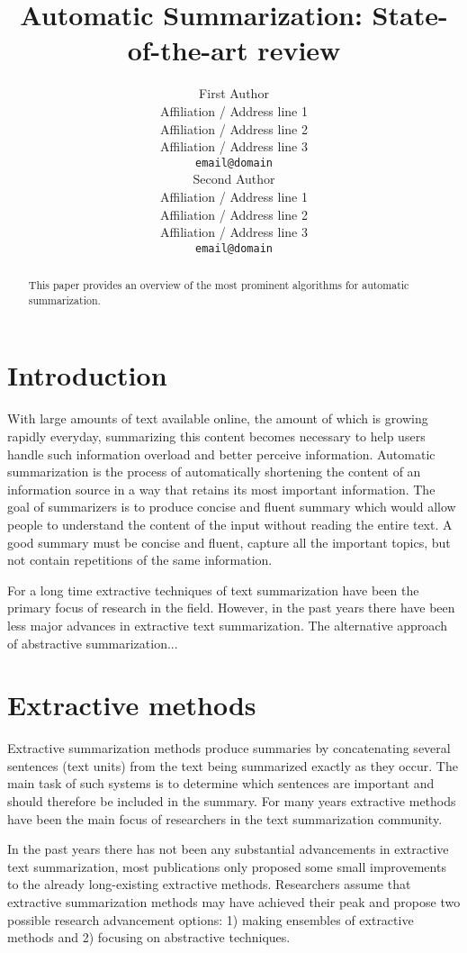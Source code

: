 \documentclass[11pt,a4paper,onecolumn]{article}
\title{Automatic Summarization: State-of-the-art review}
\author{First Author \\
  Affiliation / Address line 1 \\
  Affiliation / Address line 2 \\
  Affiliation / Address line 3 \\
  {\tt email@domain} \\\And
  Second Author \\
  Affiliation / Address line 1 \\
  Affiliation / Address line 2 \\
  Affiliation / Address line 3 \\
  {\tt email@domain} \\}
\date{}
\begin{document}
\maketitle
\begin{abstract}
This paper provides an overview of the most prominent algorithms for automatic summarization.
\end{abstract}


  \section{Introduction}

  With large amounts of text available online, the amount of which is growing rapidly everyday, summarizing this content becomes necessary to help users handle such information overload and better perceive information.
  Automatic summarization is the process of automatically shortening the content of an information source in a way that retains its most important information.
  The goal of summarizers is to produce concise and fluent summary which would allow people to understand the content of the input without reading the entire text.
  A good summary must be concise and fluent, capture all the important topics, but not contain repetitions of the same information.

  For a long time extractive techniques of text summarization have been the primary focus of research in the field.
  However, in the past years there have been less major advances in extractive text summarization.
  The alternative approach of abstractive summarization...

  \section{Extractive methods}
  Extractive summarization methods produce summaries by concatenating several sentences (text units) from the text being summarized exactly as they occur.
  The main task of such systems is to determine which sentences are important and should therefore be included in the summary.
  For many years extractive methods have been the main focus of researchers in the text summarization community.

  In the past years there has not been any substantial advancements in extractive text summarization, most publications only proposed some small improvements to the already long-existing extractive methods.
  Researchers \cite{mehta2016extractive} assume that extractive summarization methods may have achieved their peak and propose two possible research advancement options:  1) making ensembles of extractive methods and 2) focusing on abstractive techniques.
\end{document}
